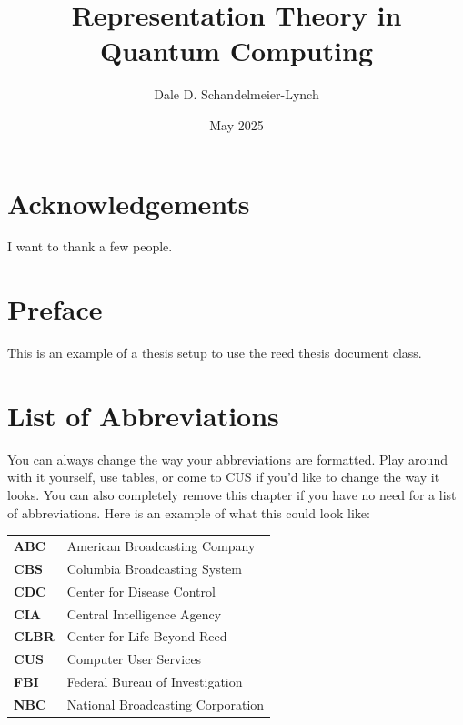 \documentclass[12pt,twoside]{reedthesis}
\title{Representation Theory in Quantum Computing}
\author{Dale D. Schandelmeier-Lynch}
\date{May 2025}
\theoremstyle{plain}   %
\theoremstyle{definition}
\theoremstyle{remark}
\numberwithin{equation}{section}
\begin{document}
  \maketitle
  \frontmatter %
  \pagestyle{empty} %

  \chapter*{Acknowledgements}
  I want to thank a few people.

  \chapter*{Preface}
  This is an example of a thesis setup to use the reed thesis document class.



  \chapter*{List of Abbreviations}
  You can always change the way your abbreviations are formatted. Play around with it yourself, use tables, or come to CUS if you'd like to change the way it looks. You can also completely remove this chapter if you have no need for a list of abbreviations. Here is an example of what this could look like:

  \begin{table}[h]
    \centering %
    \begin{tabular}{ll}
      \textbf{ABC}  	&  American Broadcasting Company \\
      \textbf{CBS}  	&  Columbia Broadcasting System\\
      \textbf{CDC}  	&  Center for Disease Control \\
      \textbf{CIA}  	&  Central Intelligence Agency\\
      \textbf{CLBR} 	&  Center for Life Beyond Reed\\
      \textbf{CUS}  	&  Computer User Services\\
      \textbf{FBI}  	&  Federal Bureau of Investigation\\
      \textbf{NBC}  	&  National Broadcasting Corporation\\
    \end{tabular}
  \end{table}
\end{document}
